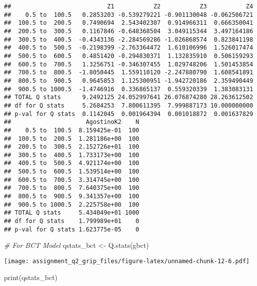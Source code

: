 \documentclass[
]{article}
\newenvironment{Shaded}{\begin{snugshade}}{\end{snugshade}}
\newcommand{\CommentTok}[1]{\textcolor[rgb]{0.56,0.35,0.01}{\textit{#1}}}
\newcommand{\FunctionTok}[1]{\textcolor[rgb]{0.00,0.00,0.00}{#1}}
\newcommand{\NormalTok}[1]{#1}
\newcommand{\OtherTok}[1]{\textcolor[rgb]{0.56,0.35,0.01}{#1}}
\begin{document}
\begin{verbatim}
##                           Z1           Z2           Z3           Z4
##    0.5 to  100.5   0.2853203 -0.539279221 -0.901130048 -0.062506721
##  100.5 to  200.5   0.7490694  2.543402307  0.914966311  0.666350041
##  200.5 to  300.5   0.1167846 -0.648368504  3.049115344  3.497164186
##  300.5 to  400.5  -0.4343136 -2.284569286 -1.026868574  0.823841198
##  400.5 to  500.5  -0.2198399 -2.763364472  1.610106996  1.526017474
##  500.5 to  600.5   0.4851420 -0.294830371  1.132835910  0.506159293
##  600.5 to  700.5   1.3256751 -0.346307455  1.029748206  1.501453854
##  700.5 to  800.5  -1.8050445  1.559110120 -2.247880790  1.608541891
##  800.5 to  900.5   0.9645853  1.125300951 -1.942720186  2.359490449
##  900.5 to 1000.5  -1.4746916  0.336865137  0.559320339  1.383083131
## TOTAL Q stats      9.2492125 24.052997641 26.076874280 28.263612502
## df for Q stats     5.2684253  7.800611395  7.999887173 10.000000000
## p-val for Q stats  0.1142045  0.001964394  0.001018872  0.001637829
##                     AgostinoK2    N
##    0.5 to  100.5  8.159425e-01  100
##  100.5 to  200.5  1.281186e+00  100
##  200.5 to  300.5  2.152726e+01  100
##  300.5 to  400.5  1.733173e+00  100
##  400.5 to  500.5  4.921174e+00  100
##  500.5 to  600.5  1.539514e+00  100
##  600.5 to  700.5  3.314745e+00  100
##  700.5 to  800.5  7.640375e+00  100
##  800.5 to  900.5  9.341357e+00  100
##  900.5 to 1000.5  2.225758e+00  100
## TOTAL Q stats     5.434049e+01 1000
## df for Q stats    1.799989e+01    0
## p-val for Q stats 1.623775e-05    0
\end{verbatim}

\begin{Shaded}
\begin{Highlighting}[]
\CommentTok{\# For BCT Model}
\NormalTok{qstats\_bct }\OtherTok{\textless{}{-}} \FunctionTok{Q.stats}\NormalTok{(gbct)}
\end{Highlighting}
\end{Shaded}

\texttt{[image: assignment\_q2\_grip\_files/figure-latex/unnamed-chunk-12-6.pdf]}

\begin{Shaded}
\begin{Highlighting}[]
\FunctionTok{print}\NormalTok{(qstats\_bct)}
\end{Highlighting}
\end{Shaded}
\end{document}
